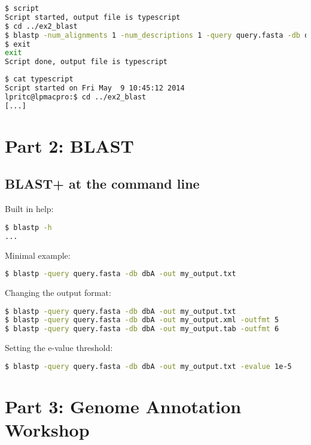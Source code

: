 \documentclass[a4paper]{article}
\begin{document}
\begin{lstlisting}[language=bash]
$ script
Script started, output file is typescript
$ cd ../ex2_blast
$ blastp -num_alignments 1 -num_descriptions 1 -query query.fasta -db dbA
$ exit
exit
Script done, output file is typescript
\end{lstlisting}

\begin{lstlisting}[language=bash]
$ cat typescript
Script started on Fri May  9 10:45:12 2014
lpritc@lpmacpro:$ cd ../ex2_blast
[...]
\end{lstlisting}

\section*{Part 2: BLAST}

\subsection*{BLAST+ at the command line}

Built in help:

\begin{lstlisting}[language=bash]
$ blastp -h
...
\end{lstlisting}

Minimal example:

\begin{lstlisting}[language=bash]
$ blastp -query query.fasta -db dbA -out my_output.txt
\end{lstlisting}

Changing the output format:

\begin{lstlisting}[language=bash]
$ blastp -query query.fasta -db dbA -out my_output.txt
$ blastp -query query.fasta -db dbA -out my_output.xml -outfmt 5
$ blastp -query query.fasta -db dbA -out my_output.tab -outfmt 6
\end{lstlisting}

Setting the e-value threshold:

\begin{lstlisting}[language=bash]
$ blastp -query query.fasta -db dbA -out my_output.txt -evalue 1e-5
\end{lstlisting}

\section*{Part 3: Genome Annotation Workshop}
\end{document}
